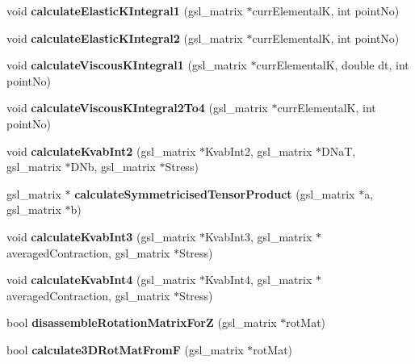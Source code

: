 \begin{DoxyCompactItemize}
\item 
\hypertarget{classShapeBase_abb02278c3894e00fdbc0cd2e379111ce}{}void {\bfseries calculate\+Elastic\+K\+Integral1} (gsl\+\_\+matrix $\ast$curr\+Elemental\+K, int point\+No)\label{classShapeBase_abb02278c3894e00fdbc0cd2e379111ce}

\item 
\hypertarget{classShapeBase_a74a5f7382e5d4038e4396d3f4a198105}{}void {\bfseries calculate\+Elastic\+K\+Integral2} (gsl\+\_\+matrix $\ast$curr\+Elemental\+K, int point\+No)\label{classShapeBase_a74a5f7382e5d4038e4396d3f4a198105}

\item 
\hypertarget{classShapeBase_a2913ab81b03bdad0368f5295fc56912d}{}void {\bfseries calculate\+Viscous\+K\+Integral1} (gsl\+\_\+matrix $\ast$curr\+Elemental\+K, double dt, int point\+No)\label{classShapeBase_a2913ab81b03bdad0368f5295fc56912d}

\item 
\hypertarget{classShapeBase_a3f0a1261dc17d4f8b7a47ba458e00cd1}{}void {\bfseries calculate\+Viscous\+K\+Integral2\+To4} (gsl\+\_\+matrix $\ast$curr\+Elemental\+K, int point\+No)\label{classShapeBase_a3f0a1261dc17d4f8b7a47ba458e00cd1}

\item 
\hypertarget{classShapeBase_ad37ab5ac465d250c7c48d2b55e855f8f}{}void {\bfseries calculate\+Kvab\+Int2} (gsl\+\_\+matrix $\ast$Kvab\+Int2, gsl\+\_\+matrix $\ast$D\+Na\+T, gsl\+\_\+matrix $\ast$D\+Nb, gsl\+\_\+matrix $\ast$Stress)\label{classShapeBase_ad37ab5ac465d250c7c48d2b55e855f8f}

\item 
\hypertarget{classShapeBase_a07e84b37967dd936115bd1adb75a0fd2}{}gsl\+\_\+matrix $\ast$ {\bfseries calculate\+Symmetricised\+Tensor\+Product} (gsl\+\_\+matrix $\ast$a, gsl\+\_\+matrix $\ast$b)\label{classShapeBase_a07e84b37967dd936115bd1adb75a0fd2}

\item 
\hypertarget{classShapeBase_a12635b0325e57f1348aff46c4825ed26}{}void {\bfseries calculate\+Kvab\+Int3} (gsl\+\_\+matrix $\ast$Kvab\+Int3, gsl\+\_\+matrix $\ast$averaged\+Contraction, gsl\+\_\+matrix $\ast$Stress)\label{classShapeBase_a12635b0325e57f1348aff46c4825ed26}

\item 
\hypertarget{classShapeBase_a77bb18dc70d5ec7de80254eee0531238}{}void {\bfseries calculate\+Kvab\+Int4} (gsl\+\_\+matrix $\ast$Kvab\+Int4, gsl\+\_\+matrix $\ast$averaged\+Contraction, gsl\+\_\+matrix $\ast$Stress)\label{classShapeBase_a77bb18dc70d5ec7de80254eee0531238}

\item 
\hypertarget{classShapeBase_a91a660608ede71c5bfdd1c4956843760}{}bool {\bfseries disassemble\+Rotation\+Matrix\+For\+Z} (gsl\+\_\+matrix $\ast$rot\+Mat)\label{classShapeBase_a91a660608ede71c5bfdd1c4956843760}

\item 
\hypertarget{classShapeBase_a9b249ac3da27e7eeb6e0604a76f15faf}{}bool {\bfseries calculate3\+D\+Rot\+Mat\+From\+F} (gsl\+\_\+matrix $\ast$rot\+Mat)\label{classShapeBase_a9b249ac3da27e7eeb6e0604a76f15faf}

\end{DoxyCompactItemize}
